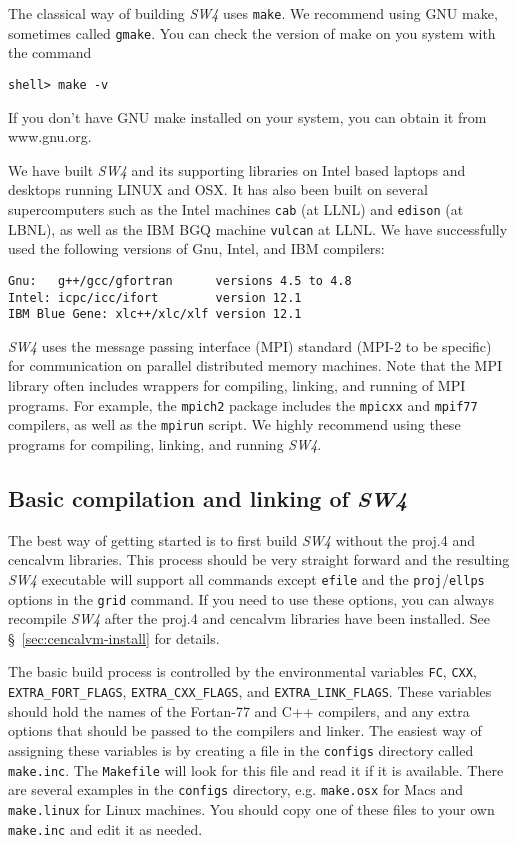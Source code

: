 \documentclass[11pt]{article}
\begin{document}
The classical way of building \emph{SW4} uses \verb+make+. We recommend using GNU make, sometimes called
\verb+gmake+. You can check the version of make on you system with the command
\begin{verbatim}
shell> make -v
\end{verbatim}
If you don't have GNU make installed on your system, you can obtain it from www.gnu.org.

We have built \emph{SW4} and its supporting libraries on Intel based laptops and desktops running
LINUX and OSX. It has also been built on several supercomputers such as the Intel machines {\tt cab}
(at LLNL) and {\tt edison} (at LBNL), as well as the IBM BGQ machine {\tt vulcan} at LLNL. We have
successfully used the following versions of Gnu, Intel, and IBM compilers:
\begin{verbatim}
Gnu:   g++/gcc/gfortran      versions 4.5 to 4.8
Intel: icpc/icc/ifort        version 12.1
IBM Blue Gene: xlc++/xlc/xlf version 12.1
\end{verbatim}

\emph{SW4} uses the message passing interface (MPI) standard (MPI-2 to be specific) for
communication on parallel distributed memory machines. Note that the MPI library often includes
wrappers for compiling, linking, and running of MPI programs. For example, the {\tt mpich2} package
includes the {\tt mpicxx} and {\tt mpif77} compilers, as well as the {\tt mpirun} script. We highly
recommend using these programs for compiling, linking, and running \emph{SW4}.


\subsection{Basic compilation and linking of \emph{SW4}}\label{sec:basic-install}

The best way of getting started is to first build \emph{SW4} without the proj.4 and cencalvm
libraries. This process should be very straight forward and the resulting \emph{SW4} executable
will support all commands except \verb+efile+ and the \verb+proj+/\verb+ellps+ options in the
\verb+grid+ command. If you need to use these options, you can always recompile \emph{SW4} after the
proj.4 and cencalvm libraries have been installed. See \S~\ref{sec:cencalvm-install} for details.

The basic build process is controlled by the environmental variables \verb+FC+, \verb+CXX+,
\verb+EXTRA_FORT_FLAGS+, \verb+EXTRA_CXX_FLAGS+, and \verb+EXTRA_LINK_FLAGS+. These variables should
hold the names of the Fortan-77 and C++ compilers, and any extra options that should be passed to
the compilers and linker. The easiest way of assigning these variables is by creating a file in the
\verb+configs+ directory called \verb+make.inc+. The \verb+Makefile+ will look for this file and
read it if it is available. There are several examples in the \verb+configs+ directory, e.g.
\verb+make.osx+ for Macs and \verb+make.linux+ for Linux machines. You should copy one of these files
to your own \verb+make.inc+ and edit it as needed.
\end{document}
